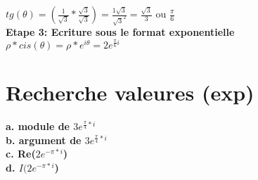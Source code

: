 $tg(\theta) = (\frac{1}{\sqrt{3}} * \frac{\sqrt{3}}{\sqrt{3}}) = \frac{1\sqrt{3}}{\sqrt{3}^{2}} = \frac{\sqrt{3}}{3}$ ou $\frac{\pi}{6}$ \\

\vspace{3mm}
\textbf{Etape 3: Ecriture sous le format exponentielle} \\

$\rho*cis(\theta) = \rho * e^{i\theta} = 2e^{\frac{\pi}{6}i}$ \\

\newpage
\section{Recherche valeures (exp)}

\textbf{a. module de $3e^{\frac{\pi}{4}*i}$} \\

\textbf{b. argument de $3e^{\frac{\pi}{4}*i}$} \\

\textbf{c. Re($2e^{-\pi*i}$)} \\

\textbf{d. $I(2e^{-\pi*i}$)} \\
